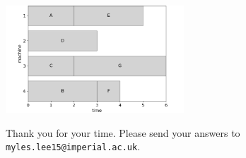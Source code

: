 \documentclass[10pt,a4paper]{article}
\begin{document}
\begin{enumerate}
	\includegraphics[width=0.5\textwidth]{figures/makespan_question2}\fbox{\rule{0.4\textwidth}{0pt}\rule{0pt}{4.7cm}}
\end{enumerate}

Thank you for your time. Please send your answers to \verb|myles.lee15@imperial.ac.uk|.
\end{document}
